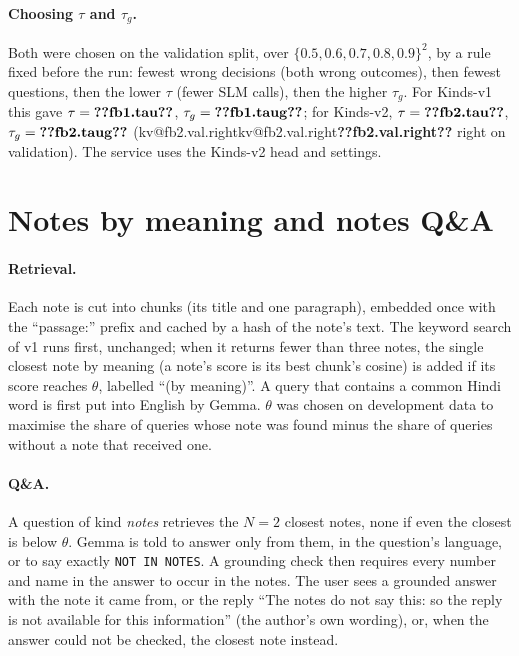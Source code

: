 \documentclass[11pt,a4paper]{article}
\makeatletter
\DeclareRobustCommand{\kv}[1]{\ifcsname kv@#1\endcsname\csname kv@#1\endcsname\else\textbf{??#1??}\fi}
\makeatother
\begin{document}
\paragraph{Choosing $\tau$ and $\tau_g$.} Both were chosen on the validation split, over
$\{0.5,0.6,0.7,0.8,0.9\}^2$, by a rule fixed before the run: fewest wrong decisions (both wrong outcomes), then
fewest questions, then the lower $\tau$ (fewer SLM calls), then the higher $\tau_g$. For Kinds-v1 this gave
$\tau=\kv{fb1.tau}$, $\tau_g=\kv{fb1.taug}$; for Kinds-v2, $\tau=\kv{fb2.tau}$, $\tau_g=\kv{fb2.taug}$
(\kv{fb2.val.right} right on validation). The service uses the Kinds-v2 head and settings.

\section{Notes by meaning and notes Q\&A}\label{sec:notes}

\paragraph{Retrieval.} Each note is cut into chunks (its title and one paragraph), embedded once with the
``passage:'' prefix and cached by a hash of the note's text. The keyword search of v1 runs first, unchanged; when it
returns fewer than three notes, the single closest note by meaning (a note's score is its best chunk's cosine) is added
if its score reaches $\theta$, labelled ``(by meaning)''. A query that contains a common Hindi word is first put into
English by Gemma. $\theta$ was chosen on development data to maximise the share of queries whose note was found minus
the share of queries without a note that received one.

\paragraph{Q\&A.} A question of kind \emph{notes} retrieves the $N=2$ closest notes, none if even the closest is below
$\theta$. Gemma is told to answer only from them, in the question's language, or to say exactly \texttt{NOT IN NOTES}.
A grounding check then requires every number and name in the answer to occur in the notes. The user sees a grounded
answer with the note it came from, or the reply ``The notes do not say this: so the reply is not available for this
information'' (the author's own wording), or, when the answer could not be checked, the closest note instead.
\end{document}

